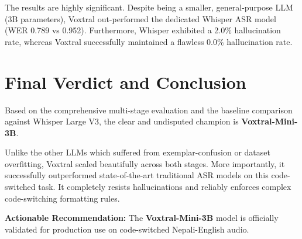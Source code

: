 \documentclass[12pt]{article}
\begin{document}
The results are highly significant. Despite being a smaller, general-purpose LLM (3B parameters), Voxtral out-performed the dedicated Whisper ASR model (WER 0.789 vs 0.952). Furthermore, Whisper exhibited a 2.0\% hallucination rate, whereas Voxtral successfully maintained a flawless 0.0\% hallucination rate.

\section{Final Verdict and Conclusion}
Based on the comprehensive multi-stage evaluation and the baseline comparison against Whisper Large V3, the clear and undisputed champion is \textbf{Voxtral-Mini-3B}. 

Unlike the other LLMs which suffered from exemplar-confusion or dataset overfitting, Voxtral scaled beautifully across both stages. More importantly, it successfully outperformed state-of-the-art traditional ASR models on this code-switched task. It completely resists hallucinations and reliably enforces complex code-switching formatting rules.

\vspace{0.5cm}
\noindent
\textbf{Actionable Recommendation:} The \textbf{Voxtral-Mini-3B} model is officially validated for production use on code-switched Nepali-English audio.
\end{document}

